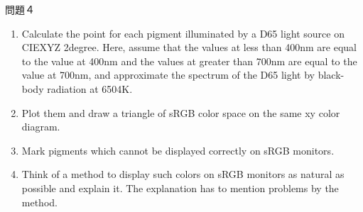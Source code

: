 \documentclass[a4paper,11pt]{jsarticle}
\numberwithin{theorem}{section}  %
\numberwithin{equation}{section} %
\begin{document}
\newpage
\begin{itembox}[l]{問題４}
\begin{enumerate}
\item
Calculate the point for each pigment illuminated by a D65 light source on CIEXYZ 2degree. Here, assume that the values at less than 400nm are equal to the value at 400nm and the values at greater than 700nm are equal to the value at 700nm, and approximate the spectrum of the D65 light by black-body radiation at 6504K.
\item
Plot them and draw a triangle of sRGB color space on the same xy color diagram.
\item
Mark pigments which cannot be displayed correctly on sRGB monitors.
\item
Think of a method to display such colors on sRGB monitors as natural as possible and explain it. The explanation has to mention problems by the method.
\end{enumerate}
\end{itembox}
\end{document}
